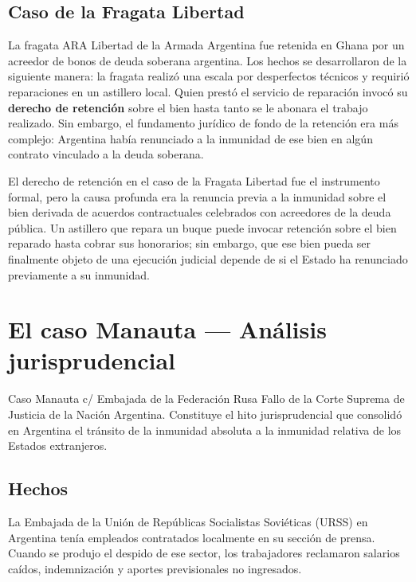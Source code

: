 \documentclass[12pt,oneside]{book}
\begin{document}
\subsection{Caso de la Fragata Libertad}

La fragata ARA Libertad de la Armada Argentina fue retenida en Ghana por un acreedor de bonos de deuda soberana argentina. Los hechos se desarrollaron de la siguiente manera: la fragata realizó una escala por desperfectos técnicos y requirió reparaciones en un astillero local. Quien prestó el servicio de reparación invocó su \textbf{derecho de retención} sobre el bien hasta tanto se le abonara el trabajo realizado. Sin embargo, el fundamento jurídico de fondo de la retención era más complejo: Argentina había renunciado a la inmunidad de ese bien en algún contrato vinculado a la deuda soberana.

\begin{note}
El derecho de retención en el caso de la Fragata Libertad fue el instrumento formal, pero la causa profunda era la renuncia previa a la inmunidad sobre el bien derivada de acuerdos contractuales celebrados con acreedores de la deuda pública. Un astillero que repara un buque puede invocar retención sobre el bien reparado hasta cobrar sus honorarios; sin embargo, que ese bien pueda ser finalmente objeto de una ejecución judicial depende de si el Estado ha renunciado previamente a su inmunidad.
\end{note}

\section{El caso Manauta --- Análisis jurisprudencial}

\begin{definition}{Caso Manauta c/ Embajada de la Federación Rusa}
Fallo de la Corte Suprema de Justicia de la Nación Argentina. Constituye el hito jurisprudencial que consolidó en Argentina el tránsito de la inmunidad absoluta a la inmunidad relativa de los Estados extranjeros.
\end{definition}

\subsection{Hechos}

La Embajada de la Unión de Repúblicas Socialistas Soviéticas (URSS) en Argentina tenía empleados contratados localmente en su sección de prensa. Cuando se produjo el despido de ese sector, los trabajadores reclamaron salarios caídos, indemnización y aportes previsionales no ingresados.
\end{document}
